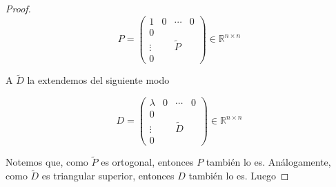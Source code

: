 \begin{propo}
\begin{proof}
\[P = \left(\begin{array}{c|ccc}
1 & 0 & \cdots & 0\\ \hline
0 & & & \\
\vdots & & \tilde{P} &\\
0 & & &
\end{array}\right) \in \mathbb{R}^{n \times n}\]

A $\tilde{D}$ la extendemos del siguiente modo

\[D = \left(\begin{array}{c|ccc}
\lambda & 0 & \cdots & 0\\ \hline
0 & & & \\
\vdots & & \tilde{D} &\\
0 & & &
\end{array}\right) \in \mathbb{R}^{n \times n}\]

Notemos que, como $\tilde{P}$ es ortogonal, entonces $P$ también lo es. Análogamente, como $\tilde{D}$ es triangular superior, entonces $D$ también lo es. Luego


\end{proof}
\end{propo}
